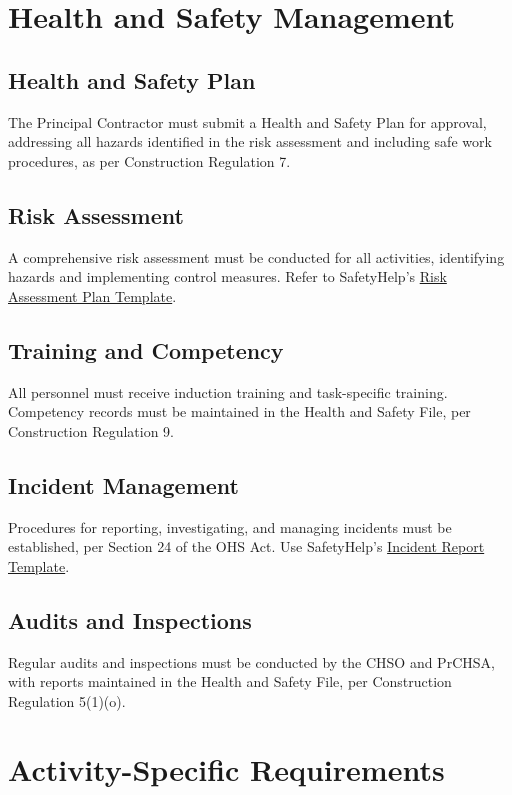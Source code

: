 \documentclass[11pt]{article}
\def\activityScaffolding{}
\begin{document}
\section{Health and Safety Management}
\subsection{Health and Safety Plan}
The Principal Contractor must submit a Health and Safety Plan for approval, addressing all hazards identified in the risk assessment and including safe work procedures, as per Construction Regulation 7.

\subsection{Risk Assessment}
A comprehensive risk assessment must be conducted for all activities, identifying hazards and implementing control measures. Refer to SafetyHelp’s \href{https://safetyfirst.help/templates/ohs-system/risk-assessment-plan-template.tex}{Risk Assessment Plan Template}.

\subsection{Training and Competency}
All personnel must receive induction training and task-specific training. Competency records must be maintained in the Health and Safety File, per Construction Regulation 9.

\subsection{Incident Management}
Procedures for reporting, investigating, and managing incidents must be established, per Section 24 of the OHS Act. Use SafetyHelp’s \href{https://safetyfirst.help/templates/ohs-system/ohs-incident-report-investigation-template.tex}{Incident Report Template}.

\subsection{Audits and Inspections}
Regular audits and inspections must be conducted by the CHSO and PrCHSA, with reports maintained in the Health and Safety File, per Construction Regulation 5(1)(o).

\section{Activity-Specific Requirements}
\ifdefined\activityScaffolding
\end{document}
